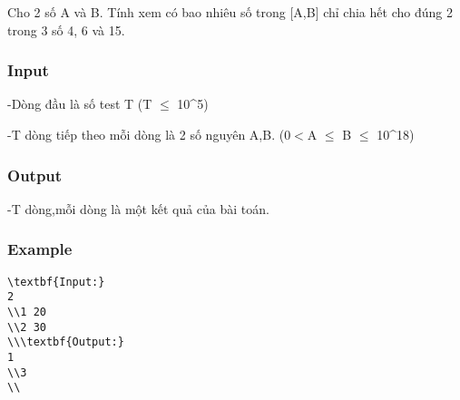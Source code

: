 



   Cho 2 số A và B. Tính xem có bao nhiêu số trong [A,B] chỉ chia hết cho đúng 2 trong 3 số 4, 6 và 15.  

\subsubsection{   Input  }

   -Dòng đầu là số test T (T $\le$ 10^5)  

   -T dòng tiếp theo mỗi dòng là 2 số nguyên A,B. (0$<$A $\le$ B $\le$ 10^18)  

\subsubsection{   Output  }

   -T dòng,mỗi dòng là một kết quả của bài toán.  



\subsubsection{   Example  }
\begin{verbatim}
\textbf{Input:}
2
\\1 20
\\2 30
\\\textbf{Output:}
1
\\3 
\\\end{verbatim}
